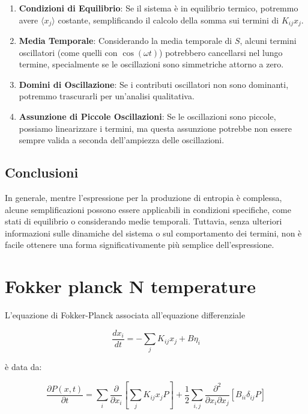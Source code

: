 \documentclass[Lau,binding=0.6cm,oneside,noexaminfo]{sapthesis}
\begin{document}
\begin{enumerate}
    \item \textbf{Condizioni di Equilibrio}: Se il sistema è in equilibrio termico, potremmo avere \( \langle x_j \rangle \) costante, semplificando il calcolo della somma sui termini di \( K_{ij} x_j \).
    
    \item \textbf{Media Temporale}: Considerando la media temporale di \( S \), alcuni termini oscillatori (come quelli con \( \cos(\omega t) \)) potrebbero cancellarsi nel lungo termine, specialmente se le oscillazioni sono simmetriche attorno a zero.
    
    \item \textbf{Domini di Oscillazione}: Se i contributi oscillatori non sono dominanti, potremmo trascurarli per un'analisi qualitativa.
    
    \item \textbf{Assunzione di Piccole Oscillazioni}: Se le oscillazioni sono piccole, possiamo linearizzare i termini, ma questa assunzione potrebbe non essere sempre valida a seconda dell'ampiezza delle oscillazioni.
\end{enumerate}

\subsection*{Conclusioni}

In generale, mentre l'espressione per la produzione di entropia è complessa, alcune semplificazioni possono essere applicabili in condizioni specifiche, come stati di equilibrio o considerando medie temporali. Tuttavia, senza ulteriori informazioni sulle dinamiche del sistema o sul comportamento dei termini, non è facile ottenere una forma significativamente più semplice dell'espressione.




\section{Fokker planck N temperature}

L'equazione di Fokker-Planck associata all'equazione differenziale

\[
\frac{dx_i}{dt} = -\sum_j K_{ij} x_j + B \eta_i
\]

è data da:

\[
\frac{\partial P(x,t)}{\partial t} = \sum_i \frac{\partial}{\partial x_i} \left[ \sum_j K_{ij} x_j P \right] + \frac{1}{2} \sum_{i,j} \frac{\partial^2}{\partial x_i \partial x_j} \left[ B_{ii} \delta_{ij} P \right]
\]
\end{document}
